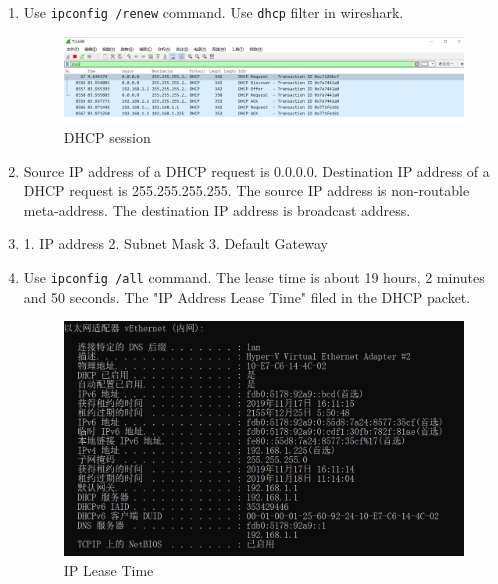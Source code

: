 \documentclass[12pt,letterpaper]{ctexart}
\begin{document}
\begin{enumerate}
  \item Use \verb|ipconfig /renew| command. Use \verb|dhcp| filter in wireshark.
  \begin{figure}[H]
    \centering
    \includegraphics[width=0.8\linewidth]{assets/dhcp.png}
    \caption{DHCP session}
  \end{figure}
  \item Source IP address of a DHCP request is 0.0.0.0. Destination IP address of a DHCP request is 255.255.255.255.
  The source IP address is non-routable meta-address. The destination IP address is broadcast address.
  \item 1. IP address 2. Subnet Mask 3. Default Gateway
  \item Use \verb|ipconfig /all| command. The lease time is about 19 hours, 2 minutes and 50 seconds. The "IP Address Lease Time" filed in the DHCP packet.
  \begin{figure}[H]
    \centering
    \includegraphics[width=0.8\linewidth]{assets/ipconfig.png}
    \caption{IP Lease Time}
  \end{figure}
\end{enumerate}
\end{document}
